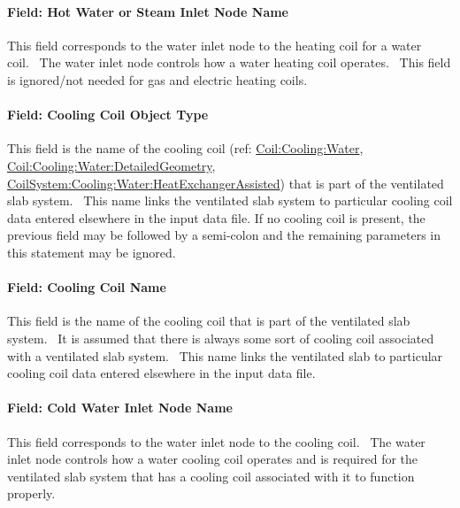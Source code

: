 \paragraph{Field: Hot Water or Steam Inlet Node Name}\label{field-hot-water-or-steam-inlet-node-name}

This field corresponds to the water inlet node to the heating coil for a water coil.~ The water inlet node controls how a water heating coil operates.~ This field is ignored/not needed for gas and electric heating coils.

\paragraph{Field: Cooling Coil Object Type}\label{field-cooling-coil-object-type-001}

This field is the name of the cooling coil (ref: \hyperref[coilcoolingwater]{Coil:Cooling:Water}, \hyperref[coilcoolingwaterdetailedgeometry]{Coil:Cooling:Water:DetailedGeometry}, \hyperref[coilsystemcoolingwaterheatexchangerassisted]{CoilSystem:Cooling:Water:HeatExchangerAssisted}) that is part of the ventilated slab system.~ This name links the ventilated slab system to particular cooling coil data entered elsewhere in the input data file. If no cooling coil is present, the previous field may be followed by a semi-colon and the remaining parameters in this statement may be ignored.

\paragraph{Field: Cooling Coil Name}\label{field-cooling-coil-name-001}

This field is the name of the cooling coil that is part of the ventilated slab system.~ It is assumed that there is always some sort of cooling coil associated with a ventilated slab system.~ This name links the ventilated slab to particular cooling coil data entered elsewhere in the input data file.

\paragraph{Field: Cold Water Inlet Node Name}\label{field-cold-water-inlet-node-name}

This field corresponds to the water inlet node to the cooling coil.~ The water inlet node controls how a water cooling coil operates and is required for the ventilated slab system that has a cooling coil associated with it to function properly.

